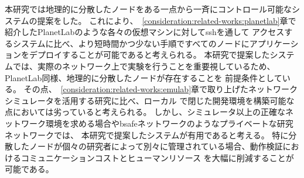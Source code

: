 本研究では地理的に分散したノードをある一点から一斉にコントロール可能なシステムの提案をした。
これにより、~\ref{consideration:related-works:planetlab}章で紹介したPlanetLabのような各々の仮想マシンに対してsshを通して
アクセスするシステムに比べ、より短時間かつ少ない手順ですべてのノードにアプリケーションをデプロイすることが可能であると考えられる。
本研究で提案したシステムでは、実際のネットワーク上で実験を行うことを重要視しているため、PlanetLab同様、地理的に分散したノードが存在することを
前提条件としている。
その点、~\ref{consideration:related-works:emulab}章で取り上げたネットワークシミュレータを活用する研究に比べ、ローカル
で閉じた開発環境を構築可能な点においては劣っていると考えられる。
しかし、シミュレータ以上の正確なネットワーク環境を求める場合やbsafeネットワークのようなプライベートな研究ネットワークでは、
本研究で提案したシステムが有用であると考える。
特に分散したノードが個々の研究者によって別々に管理されている場合、動作検証におけるコミュニケーションコストとヒューマンリソース
を大幅に削減することが可能である。

